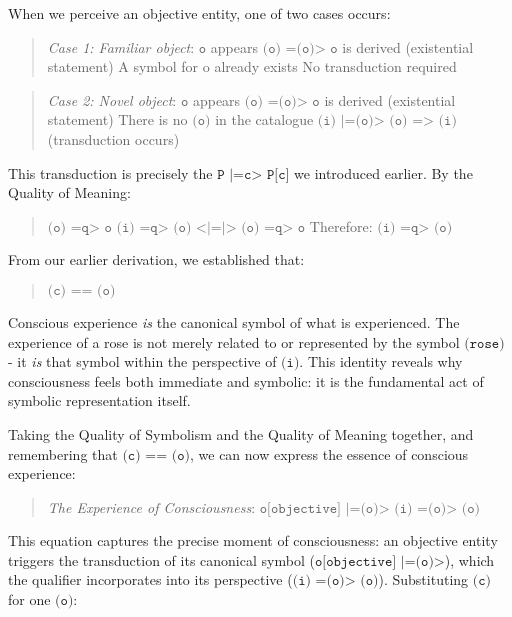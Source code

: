 \documentclass[runningheads]{llncs}
\begin{document}
When we perceive an objective entity, one of two cases occurs:

\begin{quote}
\emph{Case 1: Familiar object}:
$\texttt{o}$ appears
$\texttt{(o) =(o)> o}$ is derived (existential statement)
A symbol for o already exists
No transduction required
\end{quote}

\begin{quote}
\emph{Case 2: Novel object}:
$\texttt{o}$ appears
$\texttt{(o) =(o)> o}$ is derived (existential statement)
There is no $\texttt{(o)}$ in the catalogue
$\texttt{(i) |=(o)> (o) => (i)}$ (transduction occurs)
\end{quote}

This transduction is precisely the $\texttt{P |=c> P[c]}$ we introduced earlier. By the Quality of Meaning:

\begin{quote}
$\texttt{(o) =q> o}$
$\texttt{(i) =q> (o) <|=|> (o) =q> o}$
Therefore: $\texttt{(i) =q> (o)}$
\end{quote}

From our earlier derivation, we established that:

\begin{quote}
$\texttt{(c) == (o)}$
\end{quote}

Conscious experience \emph{is} the canonical symbol of what is experienced. The experience of a rose is not merely related to or represented by the symbol $\texttt{(rose)}$ - it \emph{is} that symbol within the perspective of $\texttt{(i)}$. This identity reveals why consciousness feels both immediate and symbolic: it is the fundamental act of symbolic representation itself.

Taking the Quality of Symbolism and the Quality of Meaning together, and remembering that $\texttt{(c) == (o)}$, we can now express the essence of conscious experience:

\begin{quote}
\emph{The Experience of Consciousness}: $\texttt{o[objective] |=(o)> (i) =(o)> (o)}$
\end{quote}

This equation captures the precise moment of consciousness: an objective entity triggers the transduction of its canonical symbol ($\texttt{o[objective] |=(o)>}$), which the qualifier incorporates into its perspective ($\texttt{(i) =(o)> (o)}$). Substituting $\texttt{(c)}$ for one $\texttt{(o)}$:
\end{document}
